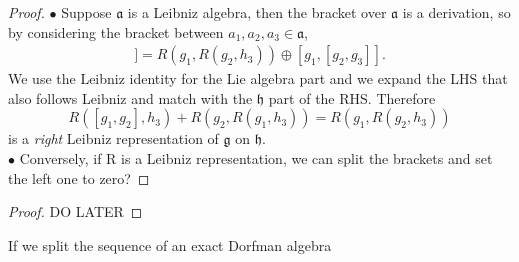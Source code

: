 \begin{proof}
    $\bullet$ Suppose $\mathfrak{a}$ is a Leibniz algebra, then the bracket over $\mathfrak{a}$ is a derivation, so by considering the bracket between $a_1,a_2,a_3 \in \mathfrak{a}$,
    \begin{align*}
        [a_1, [a_2,a_3]] = R(g_1, R(g_2,h_3)) \oplus [g_1, [g_2,g_3]].
    \end{align*}
    We use the Leibniz identity for the Lie algebra part and we expand the LHS that also follows Leibniz and match with the $\mathfrak{h}$ part of the RHS.
    Therefore
    \begin{equation}
        R([g_1,g_2], h_3) + R(g_2, R(g_1, h_3)) = R(g_1, R(g_2,h_3))
    \end{equation}
    is a \textit{right} Leibniz representation of $\mathfrak{g}$ on $\mathfrak{h}$.\\
    $\bullet$ Conversely, if R is a Leibniz representation, we can split the brackets and set the left one to zero?
\end{proof}
% 
\label{def:Dorfman morphism}
% 
\label{prop:Exact dorfman implies Leibniz rep}
\begin{proof}
    DO LATER
\end{proof}
% 
If we split the sequence of an exact Dorfman algebra 
